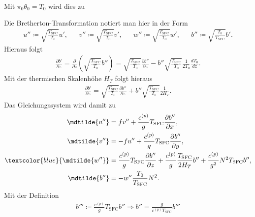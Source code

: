 %
Mit $\pi_0\theta_0 = T_0$ wird dies zu
%
\begin{center}
\end{center}
%
Die Bretherton-Transformation notiert man hier in der Form
%
\begin{align}
u'' \coloneqq\sqrt{\frac{T_\text{SFC}}{T_0}}u',&& v'' \coloneqq\sqrt{\frac{T_\text{SFC}}{T_0}}v',&& w'' \coloneqq\sqrt{\frac{T_\text{SFC}}{T_0}}w',&& b'' \coloneqq\sqrt{\frac{T_0}{T_\text{SFC}}}b'.
\end{align}
%
Hieraus folgt
%
\begin{align}
\frac{\partial b'}{\partial z} = \frac{\partial}{\partial z}\left(\sqrt{\frac{T_\text{SFC}}{T_0}}b''\right) = \sqrt{\frac{T_\text{SFC}}{T_0}}\frac{\partial b''}{\partial z} - b''\sqrt{\frac{T_\text{SFC}}{T_0}}\frac{1}{2T_0}\frac{dT_0}{dz}.
\end{align}
%
Mit der thermischen Skalenhöhe $H_T$ folgt hieraus
%
\begin{align}
\frac{\partial b'}{\partial z} = \sqrt{\frac{T_\text{SFC}}{T_0}}\frac{\partial b''}{\partial z} + b''\sqrt{\frac{T_\text{SFC}}{T_0}}\frac{1}{2H_T}.
\end{align}
%
Das Gleichungssystem wird damit zu
%
\begin{align}
\mdtilde{u''} & = fv'' + \frac{c^{(p)}}{g}T_\text{SFC}\frac{\partial b''}{\partial x},\\
\mdtilde{v''} & = -fu'' + \frac{c^{(p)}}{g}T_\text{SFC}\frac{\partial b''}{\partial y},\\
\textcolor{blue}{\mdtilde{w''}} & = \frac{c^{(p)}}{g}T_\text{SFC}\frac{\partial b''}{\partial z} + \frac{c^{(p)}}{g}\frac{T_\text{SFC}}{2H_T}b'' + \frac{c^{(p)}}{g^2}N^2T_\text{SFC}b'',\\
\mdtilde{b''} & = -w''\frac{T_0}{T_\text{SFC}}N^2.
\end{align}
%
Mit der Definition
%
\begin{align}
b''' \coloneqq \frac{c^{(p)}}{g}T_\text{SFC}b'' \Rightarrow b'' = \frac{g}{c^{(p)}T_\text{SFC}}b'''
\end{align}
